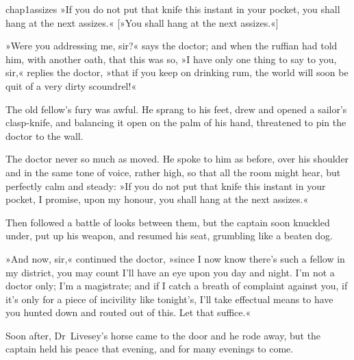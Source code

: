 
\begin{bwbigpic}
	[\picsize]
	{chap1assizes}
	{»If you do not put that knife this instant in your pocket, you shall hang at the next assizes.«}
	[»You shall hang at the next assizes.«]
\end{bwbigpic}


»Were you addressing me, sir?« says the doctor; and when the ruffian had told him, with another oath, that this was so, »I have only one thing to say to you, sir,« replies the doctor, »that if you keep on drinking rum, the world will soon be quit of a very dirty scoundrel!«

The old fellow's fury was awful. He sprang to his feet, drew and opened a sailor's clasp-knife, and balancing it open on the palm of his hand, threatened to pin the doctor to the wall.

The doctor never so much as moved. He spoke to him as before, over his shoulder and in the same tone of voice, rather high, so that all the room might hear, but perfectly calm and steady: »If you do not put that knife this instant in your pocket, I promise, upon my honour, you shall hang at the next assizes.«


Then followed a battle of looks between them, but the captain soon knuckled under, put up his weapon, and resumed his seat, grumbling like a beaten dog.

»And now, sir,« continued the doctor, »since I now know there's such a fellow in my district, you may count I'll have an eye upon you day and night. I'm not a doctor only; I'm a magistrate; and if I catch a breath of complaint against you, if it's only for a piece of incivility like tonight's, I'll take effectual means to have you hunted down and routed out of this. Let that suffice.«

Soon after, Dr~Livesey's horse came to the door and he rode away, but the captain held his peace that evening, and for many evenings to come.
